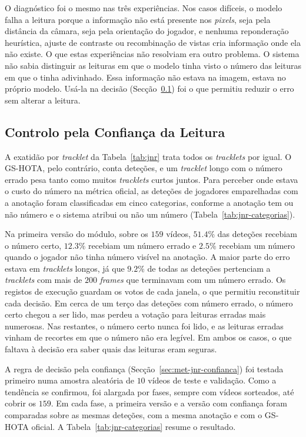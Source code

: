 O diagnóstico foi o mesmo nas três experiências. Nos casos difíceis, o modelo falha a leitura
porque a informação não está presente nos \emph{pixels}, seja pela distância da câmara, seja pela
orientação do jogador, e nenhuma reponderação heurística, ajuste de contraste ou recombinação de
vistas cria informação onde ela não existe. O que estas experiências não resolviam era outro
problema. O sistema não sabia distinguir as leituras em que o modelo tinha visto o número das
leituras em que o tinha adivinhado. Essa informação não estava na imagem, estava no próprio modelo.
Usá-la na decisão (Secção~\ref{sec:res_jnr_confianca}) foi o que permitiu reduzir o erro sem alterar a
leitura.

\subsection{Controlo pela Confiança da Leitura}\label{sec:res_jnr_confianca}

A exatidão por \emph{tracklet} da Tabela~\ref{tab:jnr} trata todos os \emph{tracklets} por igual.
O GS-HOTA, pelo contrário, conta deteções, e um \emph{tracklet} longo com o número errado pesa
tanto como muitos \emph{tracklets} curtos juntos. Para perceber onde estava o custo do número na
métrica oficial, as deteções de jogadores emparelhadas com a anotação foram classificadas em cinco
categorias, conforme a anotação tem ou não número e o sistema atribui ou não um número
(Tabela~\ref{tab:jnr-categorias}).

Na primeira versão do módulo, sobre os $159$ vídeos, $51.4\%$ das deteções recebiam o número
certo, $12.3\%$ recebiam um número errado e $2.5\%$ recebiam um número quando o jogador não tinha
número visível na anotação. A maior parte do erro estava em \emph{tracklets} longos, já que $9.2\%$ de
todas as deteções pertenciam a \emph{tracklets} com mais de $200$ \emph{frames} que terminavam com
um número errado. Os registos de execução guardam os votos de cada janela, o que permitiu
reconstituir cada decisão. Em cerca de um terço das deteções com número errado, o número certo
chegou a ser lido, mas perdeu a votação para leituras erradas mais numerosas. Nas restantes, o número certo nunca foi lido, e as
leituras erradas vinham de recortes em que o número não era legível. Em ambos os casos, o que faltava à decisão era saber
quais das leituras eram seguras.

A regra de decisão pela confiança (Secção~\ref{sec:met-jnr-confianca}) foi testada primeiro numa
amostra aleatória de $10$ vídeos de teste e validação. Como a tendência se confirmou, foi alargada
por fases, sempre com vídeos sorteados, até cobrir os $159$.
Em cada fase, a primeira versão e a versão com confiança foram comparadas sobre as mesmas deteções,
com a mesma anotação e com o GS-HOTA oficial. A Tabela~\ref{tab:jnr-categorias} resume o resultado.

